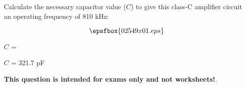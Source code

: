 

Calculate the necessary capacitor value ($C$) to give this class-C amplifier circuit an operating frequency of 810 kHz:

$$\epsfbox{02549x01.eps}$$

$C$ = 







$C$ = 321.7 pF







{\bf This question is intended for exams only and not worksheets!}.




